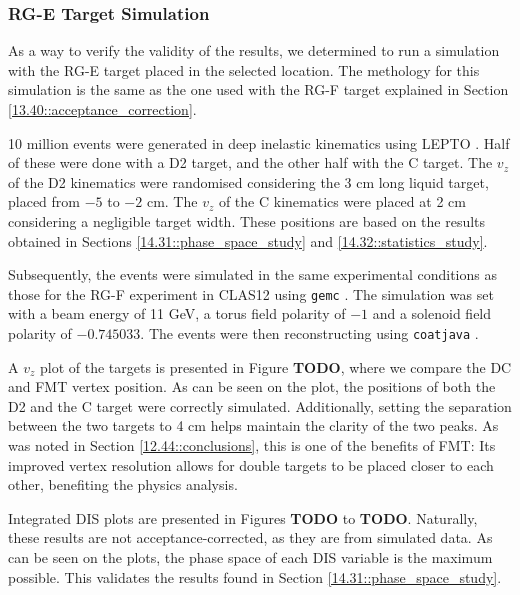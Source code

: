 \subsubsection{RG-E Target Simulation}
\label{14.33::rge_target_simulation}
    As a way to verify the validity of the results, we determined to run a simulation with the RG-E target placed in the selected location.
    The methology for this simulation is the same as the one used with the RG-F target explained in Section \ref{13.40::acceptance_correction}.

    10 million events were generated in deep inelastic kinematics using LEPTO \cite{ingelman1997}.
    Half of these were done with a D2 target, and the other half with the C target.
    The $v_z$ of the D2 kinematics were randomised considering the 3 cm long liquid target, placed from $-5$ to $-2$ cm.
    The $v_z$ of the C kinematics were placed at 2 cm considering a negligible target width.
    These positions are based on the results obtained in Sections \ref{14.31::phase_space_study} and \ref{14.32::statistics_study}.

    Subsequently, the events were simulated in the same experimental conditions as those for the RG-F experiment in CLAS12 using \texttt{gemc} \cite{ungaro2020gemc}.
    The simulation was set with a beam energy of 11 GeV, a torus field polarity of $-1$ and a solenoid field polarity of $-0.745033$.
    The events were then reconstructing using \texttt{coatjava} \cite{ziegler2020}.

    A $v_z$ plot of the targets is presented in Figure \textbf{TODO}, where we compare the DC and FMT vertex position.
    As can be seen on the plot, the positions of both the D2 and the C target were correctly simulated.
    Additionally, setting the separation between the two targets to 4 cm helps maintain the clarity of the two peaks.
    As was noted in Section \ref{12.44::conclusions}, this is one of the benefits of FMT: Its improved vertex resolution allows for double targets to be placed closer to each other, benefiting the physics analysis.

    Integrated DIS plots are presented in Figures \textbf{TODO} to \textbf{TODO}.
    Naturally, these results are not acceptance-corrected, as they are from simulated data.
    As can be seen on the plots, the phase space of each DIS variable is the maximum possible.
    This validates the results found in Section \ref{14.31::phase_space_study}.

